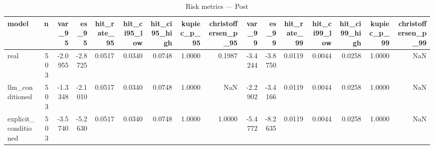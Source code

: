 \begin{table}
\caption{Risk metrics — Post}
\label{tab:risk_Post}
\begin{tabular}{lrrrrrrrrrrrrrrr}
\toprule
model & n & var\_95 & es\_95 & hit\_rate\_95 & hit\_ci95\_low & hit\_ci95\_high & kupiec\_p\_95 & christoffersen\_p\_95 & var\_99 & es\_99 & hit\_rate\_99 & hit\_ci99\_low & hit\_ci99\_high & kupiec\_p\_99 & christoffersen\_p\_99 \\
\midrule
real & 503 & -2.0955 & -2.8725 & 0.0517 & 0.0340 & 0.0748 & 1.0000 & 0.1987 & -3.4244 & -3.8750 & 0.0119 & 0.0044 & 0.0258 & 1.0000 & NaN \\
llm\_conditioned & 503 & -1.3348 & -2.1010 & 0.0517 & 0.0340 & 0.0748 & 1.0000 & NaN & -2.2902 & -3.4166 & 0.0119 & 0.0044 & 0.0258 & 1.0000 & NaN \\
explicit\_conditioned & 503 & -3.5740 & -5.2630 & 0.0517 & 0.0340 & 0.0748 & 1.0000 & 1.0000 & -5.4772 & -8.2635 & 0.0119 & 0.0044 & 0.0258 & 1.0000 & NaN \\
\bottomrule
\end{tabular}
\end{table}
